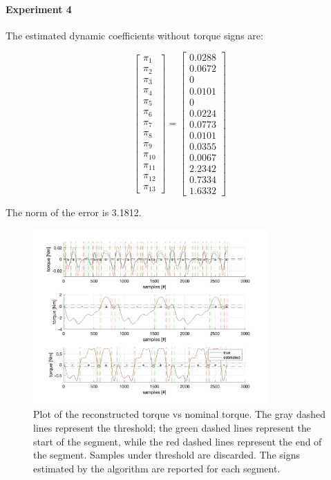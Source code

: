 \documentclass{article}
\begin{document}
\pagebreak

\paragraph{Experiment 4} The estimated dynamic coefficients without torque signs are:

\[\begin{bmatrix}
\pi_1 \\ \pi_2 \\ \pi_3 \\ \pi_4 \\ \pi_5 \\ \pi_6 \\ \pi_7 \\ \pi_8 \\  \pi_9 \\ \pi_{10} \\ \pi_{11} \\ \pi_{12} \\ \pi_{13}
\end{bmatrix}=\begin{bmatrix}
0.0288 \\ 0.0672 \\ 0 \\ 0.0101 \\ 0 \\ 0.0224 \\ 0.0773 \\ 0.0101 \\ 0.0355 \\ 0.0067 \\ 2.2342 \\ 0.7334 \\ 1.6332
\end{bmatrix}\]

The norm of the error is 3.1812.

\begin{figure}[!htbp]
\centering
\includegraphics[width=0.8\textwidth]{images/3-dof/results_experiment4.png}
\caption{Plot of the reconstructed torque vs nominal torque. The gray dashed lines represent the threshold; the green dashed lines represent the start of the segment, while the red dashed lines represent the end of the segment. Samples under threshold are discarded. The signs estimated by the algorithm are reported for each segment.}
\end{figure}
\FloatBarrier
\end{document}
